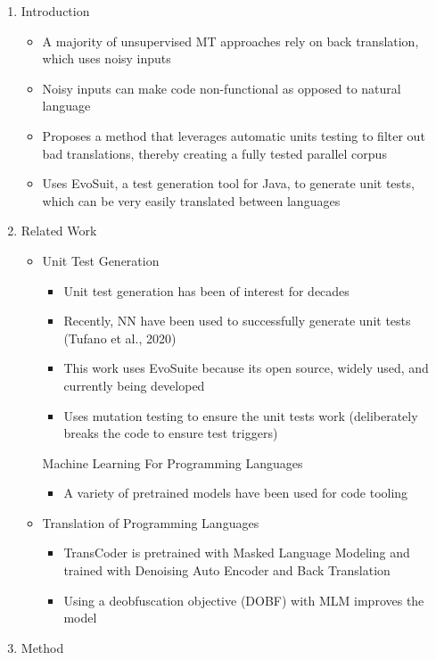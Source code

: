\documentclass{article}
\begin{document}
\begin{enumerate}
	\item Introduction
	\begin{itemize}
		\item A majority of unsupervised MT approaches rely on back translation, which uses noisy inputs
		\item Noisy inputs can make code non-functional as opposed to natural language
		\item Proposes a method that leverages automatic units testing to filter out bad translations, thereby creating a fully tested parallel corpus
		\item Uses EvoSuit, a test generation tool for Java, to generate unit tests, which can be very easily translated between languages
	\end{itemize}
	\item Related Work
	\begin{itemize}
		\item Unit Test Generation
		\begin{itemize}
			\item Unit test generation has been of interest for decades
			\item Recently, NN have been used to successfully generate unit tests (Tufano et al., 2020)
			\item This work uses EvoSuite because its open source, widely used, and currently being developed
			\item Uses mutation testing to ensure the unit tests work (deliberately breaks the code to ensure test triggers)
		\end{itemize}
		Machine Learning For Programming Languages
		\begin{itemize}
			\item A variety of pretrained models have been used for code tooling
		\end{itemize}
		\item Translation of Programming Languages
		\begin{itemize}
			\item TransCoder is pretrained with Masked Language Modeling and trained with Denoising Auto Encoder and Back Translation
			\item Using a deobfuscation objective (DOBF) with MLM improves the model
		\end{itemize}
	\end{itemize}
	\item Method
	\begin{enumerate}

\end{enumerate}
\end{enumerate}
\end{document}
